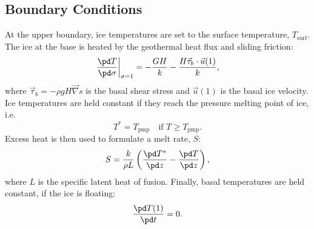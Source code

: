 \subsection{Boundary Conditions}
At the upper boundary, ice temperatures are set to the surface temperature, $T_{\text{surf}}$. The ice at the base is heated by the geothermal heat flux and sliding friction:
\begin{equation}
  \left.\frac{\pd T}{\pd\sigma}\right|_{\sigma=1}=-\frac{GH}k-\frac{H\vec{\tau}_b\cdot\vec{u}(1)}k,
\end{equation}
where $\vec{\tau}_b=-\rho gH\vec\nabla s$ is the basal shear stress and $\vec{u}(1)$ is the basal ice velocity. Ice temperatures are held constant if they reach the pressure melting point of ice, i.e.
\begin{equation}
  T^\ast=T_{\text{pmp}} \quad\text{if $T\ge T_{\text{pmp}}$}.
\end{equation}
Excess heat is then used to formulate a melt rate, $S$:
\begin{equation}
  \label{temp.eq.meltrate}
  S=\frac{k}{\rho L}\left(\frac{\pd T^\ast}{\pd z}-\frac{\pd T}{\pd z}\right),
\end{equation}
where $L$ is the specific latent heat of fusion. Finally, basal temperatures are held constant, if the ice is floating:
\begin{equation}
  \frac{\pd T(1)}{\pd t}  = 0.
\end{equation}


